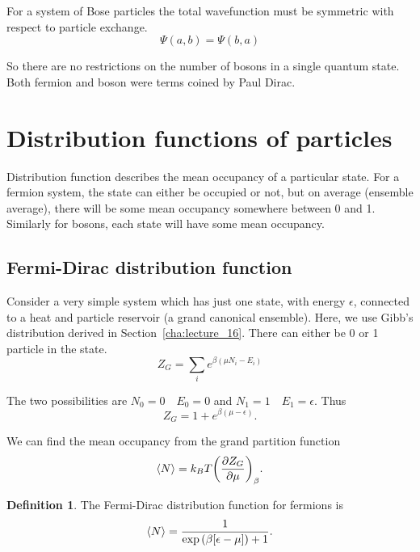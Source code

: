 \documentclass[12pt,chapterprefix=false,dvipsnames]{scrbook}
\theoremstyle{dotless}
\theoremstyle{definition}
\newtheorem{protodefinition}{Definition}[section]
\newenvironment{definition}
{\colorlet{shadecolor}{black!15}\begin{shaded}\begin{protodefinition}}
			{\end{protodefinition}\end{shaded}}
\begin{document}
For a system of Bose particles the total wavefunction must be
symmetric with respect to particle exchange.
\begin{equation}
	\Psi\left(a,b\right) =
	\Psi\left(b,a\right)
\end{equation}

So there are no restrictions on the number of bosons in a single
quantum state. Both fermion and boson were terms coined by Paul
Dirac.

\section{Distribution functions of particles}%
\label{sec:distribution_functions_of_particles}

Distribution function describes the mean occupancy of a
particular state. For a fermion system, the state can either be
occupied or not, but on average (ensemble average), there will
be some mean occupancy somewhere between 0 and 1. Similarly for
bosons, each state will have some mean occupancy.

\subsection{Fermi-Dirac distribution function}%
\label{sub:fermi_dirac_distribution_function}

Consider a very simple system which has just one state, with
energy $\epsilon$, connected to a heat and particle
reservoir (a grand canonical ensemble). Here, we use Gibb's
distribution derived in Section~\ref{cha:lecture_16}. There
can either be 0 or 1 particle in the state.
\begin{equation}
	Z_G = \sum_i e^{\beta \left(\mu N_i - E_i\right)}
\end{equation}

The two possibilities are $N_0 = 0\hspace{1em} E_0 = 0$ and
$N_1 = 1 \hspace{1em} E_1 = \epsilon$. Thus
\begin{equation}
	Z_G = 1 + e^{\beta\left( \mu - \epsilon\right)}.
\end{equation}

We can find the mean occupancy from the grand partition function
\begin{equation}
	\left<N\right>
	=
	k_B T {\left(\pdv{Z_G}{\mu}\right)}_{\beta}.
\end{equation}

\begin{definition}
	The Fermi-Dirac distribution function for fermions is
	\begin{equation}
		\label{eq:fermi_dirac_distribution_function}
		\left<N\right>
		= \frac{1}{\exponential\left(\beta [\epsilon - \mu]\right) + 1}.
	\end{equation}
\end{definition}
\end{document}
